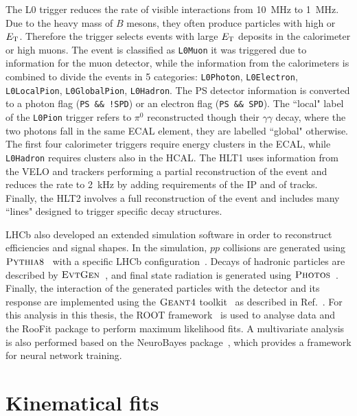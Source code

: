 The L0 trigger reduces the rate of visible interactions from 10~MHz to 1~MHz.
Due to the heavy mass of $B$ mesons, they often produce particles with high \pt or $E_{\rm T}$.
Therefore the trigger selects events with large $E_{\rm T}$ deposits in the calorimeter
or high \pt muons. The event is classified as \verb!L0Muon! it was triggered due to information
for the muon detector, while the information from the calorimeters is combined to divide the
events in 5 categories: \verb!L0Photon!, \verb!L0Electron!, \verb!L0LocalPion!, 
\verb!L0GlobalPion!, \verb!L0Hadron!. The PS detector information is converted to a photon flag 
(\verb|PS && !SPD|) or an electron flag (\verb|PS && SPD|). The ``local" label of the \verb!L0Pion! trigger 
refers to $\pi^0$ reconstructed though their $\gamma\gamma$ decay, where the two photons fall in the 
same ECAL element, they are labelled ``global" otherwise. The first four calorimeter triggers require 
energy clusters in the ECAL, while \verb!L0Hadron! requires clusters also in the HCAL. 
The HLT1 uses information from the VELO and trackers performing a partial reconstruction 
of the event and reduces the rate to 2~kHz by adding requirements of the IP and \chisq of tracks.
Finally, the HLT2 involves a full reconstruction of the event and includes many ``lines" designed 
to trigger specific decay structures.

LHCb also developed an extended simulation software in order to reconstruct efficiencies and signal shapes.
In the simulation, $pp$ collisions are generated using $\textsc{Pythia}8$~\cite{Sjostrand:2006za,Sjostrand:2007gs} with a specific
LHCb configuration~\cite{LHCb-PROC-2010-056}. Decays of hadronic particles are described by $\textsc{EvtGen}$~\cite{Lange:2001uf},
and final state radiation is generated using $\textsc{Photos}$~\cite{Golonka:2005pn}. Finally, the interaction of the generated
particles with the detector and its response are implemented using the $\textsc{Geant4}$ toolkit~\cite{Allison:2006ve}
as described in Ref.~\cite{LHCb-PROC-2011-006}. For this analysis in this thesis, the ROOT framework~\cite{Brun:2000es} is
used to analyse data and the RooFit package to perform maximum likelihood fits. A multivariate analysis is also performed
based on the NeuroBayes package~\cite{Feindt:2006pm,feindt-2004}, which provides a framework for neural network training.

\section{Kinematical fits}
\label{sec:DTF}

